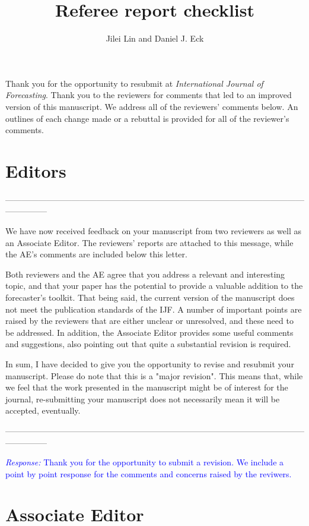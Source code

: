 \documentclass[12pt]{article}
\title{Referee report checklist}
\author{Jilei Lin and Daniel J. Eck}
\date{}
\newcommand{\response}[1]{\noindent \textcolor{blue}{\emph{Response:} #1}}
\begin{document}
\maketitle

Thank you for the opportunity to resubmit at \emph{International Journal of Forecasting}. Thank you to the reviewers for comments that led to an improved version of this manuscript. We address all of the reviewers' comments below. An outlines of each change made or a rebuttal is provided for all of the reviewer's comments.

\section*{Editors}

---------------------------------------------------------------------------------------------------------------------------


We have now received feedback on your manuscript from two reviewers as well as an Associate Editor. The reviewers' reports are attached to this message, while the AE's comments are included below this letter.

Both reviewers and the AE agree that you address a relevant and interesting topic, and that your paper has the potential to provide a valuable addition to the forecaster's toolkit. That being said, the current version of the manuscript does not meet the publication standards of the IJF. A number of important points are raised by the reviewers that are either unclear or unresolved, and these need to be addressed. In addition, the Associate Editor provides some useful comments and suggestions, also pointing out that quite a substantial revision is required.

In sum, I have decided to give you the opportunity to revise and resubmit your manuscript. Please do note that this is a "major revision". This means that, while we feel that the work presented in the manuscript might be of interest for the journal, re-submitting your manuscript does not necessarily mean it will be accepted, eventually.

---------------------------------------------------------------------------------------------------------------------------

\response{Thank you for the opportunity to submit a revision. We include a point by point response for the comments and concerns raised by the reviwers.}

\section*{Associate Editor}
\end{document}
